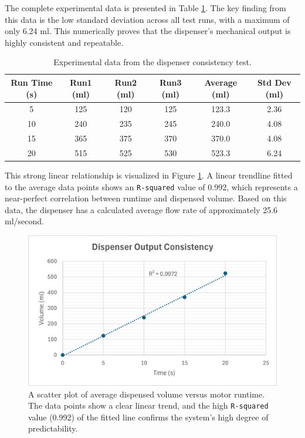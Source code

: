 The complete experimental data is presented in Table \ref{tab:dispenser_data}. The key finding from this data is the low standard deviation across all test runs, with a maximum of only 6.24 ml. This numerically proves that the dispenser's mechanical output is highly consistent and repeatable.

\begin{table}[h!]
    \centering
    \caption{Experimental data from the dispenser consistency test.}
    \label{tab:dispenser_data}
    \begin{tabular}{c c c c c c}
        \hline
        \textbf{Run Time (s)} & \textbf{Run1 (ml)} & \textbf{Run2 (ml)} & \textbf{Run3 (ml)} & \textbf{Average (ml)} & \textbf{Std Dev (ml)} \\
        \hline
        5                     & 125                & 120                & 125                & 123.3                 & 2.36                  \\
        10                    & 240                & 235                & 245                & 240.0                 & 4.08                  \\
        15                    & 365                & 375                & 370                & 370.0                 & 4.08                  \\
        20                    & 515                & 525                & 530                & 523.3                 & 6.24                  \\
        \hline
    \end{tabular}
\end{table}

This strong linear relationship is visualized in Figure \ref{fig:dispenser_graph}. A linear trendline fitted to the average data points shows an \texttt{R-squared} value of 0.992, which represents a near-perfect correlation between runtime and dispensed volume. Based on this data, the dispenser has a calculated average flow rate of approximately 25.6 ml/second.

\begin{figure}[h!]
    \centering
    \includegraphics[width=0.8\linewidth]{figures/dispenser_graph.png} %
    \caption[Dispenser Output Consistency Graph.]
    {A scatter plot of average dispensed volume versus motor runtime. The data points show a clear linear trend, and the high \texttt{R-squared} value (0.992) of the fitted line confirms the system's high degree of predictability.}
    \label{fig:dispenser_graph}
\end{figure}

